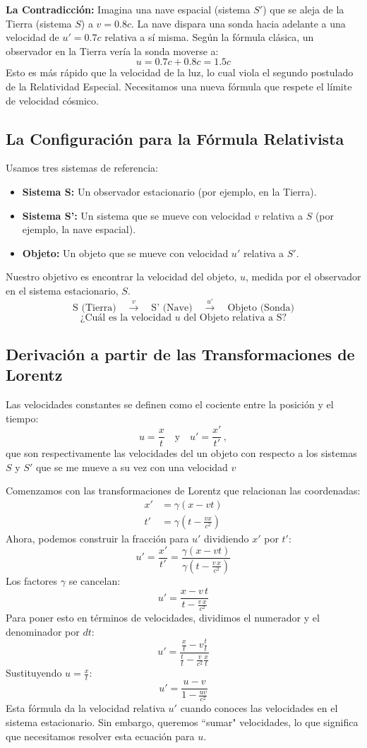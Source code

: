 \documentclass[11pt,a4paper]{article}
\begin{document}
\textbf{La Contradicción:} Imagina una nave espacial (sistema $S'$) que se aleja de la Tierra (sistema $S$) a $v=0.8c$. La nave dispara una sonda hacia adelante a una velocidad de $u'=0.7c$ relativa a sí misma. Según la fórmula clásica, un observador en la Tierra vería la sonda moverse a:
\[ u = 0.7c + 0.8c = 1.5c \]
Esto es más rápido que la velocidad de la luz, lo cual viola el segundo postulado de la Relatividad Especial. Necesitamos una nueva fórmula que respete el límite de velocidad cósmico.

\subsection{La Configuración para la Fórmula Relativista}

Usamos tres sistemas de referencia:
\begin{itemize}
    \item \textbf{Sistema S:} Un observador estacionario (por ejemplo, en la Tierra).
    \item \textbf{Sistema S':} Un sistema que se mueve con velocidad $v$ relativa a $S$ (por ejemplo, la nave espacial).
    \item \textbf{Objeto:} Un objeto que se mueve con velocidad $u'$ relativa a $S'$.
\end{itemize}
Nuestro objetivo es encontrar la velocidad del objeto, \textbf{$u$}, medida por el observador en el sistema estacionario, $S$.
\[
\text{S (Tierra)} \quad \xrightarrow{v} \quad \text{S' (Nave)} \quad \xrightarrow{u'} \quad \text{Objeto (Sonda)}
\]
\[
\text{¿Cuál es la velocidad } u \text{ del Objeto relativa a S?}
\]

\subsection{Derivación a partir de las Transformaciones de Lorentz}

Las velocidades constantes se definen como el cociente entre la posición y el tiempo:
\[ u = \frac{x}{t} \quad \text{y} \quad u' = \frac{x'}{t'}\,, \]
que son respectivamente las velocidades del un objeto con respecto a los sistemas $S$ y $S'$ que se me mueve a su vez con una velocidad $v$

Comenzamos con las transformaciones de Lorentz que relacionan las coordenadas:
\begin{align*}
x' &= \gamma(x - vt) \\
t' &= \gamma\left(t - \frac{vx}{c^2}\right)
\end{align*}
Ahora, podemos construir la fracción para $u'$ dividiendo $x'$ por $t'$:
\[ u' = \frac{x'}{t'} = \frac{\gamma(x - vt)}{\gamma\left(t - \frac{v\,x}{c^2}\right)} \]
Los factores $\gamma$ se cancelan:
\[ u' = \frac{x - v\,t}{t - \frac{v\,x}{c^2}} \]
Para poner esto en términos de velocidades, dividimos el numerador y el denominador por $dt$:
\[ u' = \frac{\frac{x}{t} - v\frac{t}{t}}{\frac{t}{t} - \frac{v}{c^2}\frac{x}{t}} \]
Sustituyendo $u = \frac{x}{t}$:
\[ u' = \frac{u - v}{1 - \frac{uv}{c^2}} \]
Esta fórmula da la velocidad relativa $u'$ cuando conoces las velocidades en el sistema estacionario. Sin embargo, queremos ``sumar" velocidades, lo que significa que necesitamos resolver esta ecuación para $u$.
\end{document}
